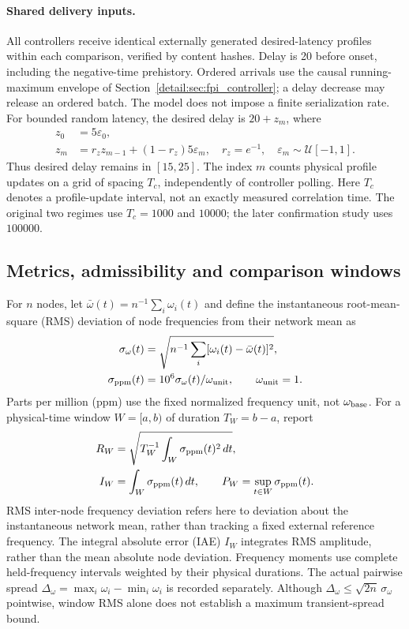 \paragraph{Shared delivery inputs.}
All controllers receive identical externally generated desired-latency
profiles within each comparison, verified by content hashes. Delay is
20 before onset, including the negative-time prehistory. Ordered arrivals
use the causal running-maximum envelope of
Section~\ref{detail:sec:fpi_controller}; a delay decrease may release an ordered
batch. The model does not impose a finite serialization rate.
For bounded random latency, the desired delay is $20+z_m$, where
\begin{align}
 z_0&=5\varepsilon_0,\nonumber\\
 z_m&=r_z z_{m-1}+(1-r_z)5\varepsilon_m,
 \quad r_z=e^{-1},\quad\varepsilon_m\sim\mathcal U[-1,1].
 \label{detail:eq:eval_random_profile}
\end{align}
Thus desired delay remains in $[15,25]$. The index $m$ counts physical
profile updates on a grid of spacing $T_c$, independently of controller
polling. Here $T_c$ denotes a profile-update interval, not an exactly
measured correlation time. The original two regimes use $T_c=1000$
and $10000$; the later confirmation study uses $100000$.

\subsection{Metrics, admissibility and comparison windows}
\label{detail:subsec:eval_metrics}

For $n$ nodes, let $\bar\omega(t)=n^{-1}\sum_i\omega_i(t)$ and define
the instantaneous root-mean-square (RMS) deviation of node frequencies
from their network mean as
\begin{align}
 \sigma_\omega(t)&=\sqrt{n^{-1}\sum_i[\omega_i(t)-\bar\omega(t)]^2},\nonumber\\
 \sigma_{\rm ppm}(t)&=10^6\sigma_\omega(t)/\omega_{\rm unit},
 \qquad\omega_{\rm unit}=1.
 \label{detail:eq:eval_disagreement_amplitude}
\end{align}
Parts per million (ppm) use the fixed normalized frequency unit, not
$\omega_{\rm base}$. For a physical-time window $W=[a,b)$ of duration
$T_W=b-a$, report
\begin{align}
 R_W&=\sqrt{T_W^{-1}\int_W\sigma_{\rm ppm}(t)^2\,dt},\nonumber\\
 I_W&=\int_W\sigma_{\rm ppm}(t)\,dt,
 \qquad P_W=\sup_{t\in W}\sigma_{\rm ppm}(t).
 \label{detail:eq:eval_frequency_metrics}
\end{align}
RMS inter-node frequency deviation refers here to deviation about
the instantaneous network mean, rather than tracking a fixed
external reference frequency.
The integral absolute error (IAE) $I_W$ integrates RMS amplitude, rather
than the mean absolute node deviation. Frequency moments use complete
held-frequency intervals weighted by their physical durations.
The actual pairwise spread $\Delta_\omega=\max_i\omega_i-\min_i\omega_i$
is recorded separately. Although
$\Delta_\omega\le\sqrt{2n}\,\sigma_\omega$ pointwise, window RMS alone
does not establish a maximum transient-spread bound.

